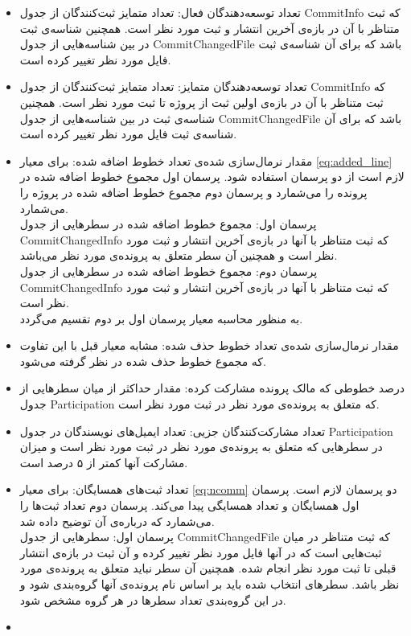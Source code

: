 \begin{itemize}
	\item 
	تعداد توسعه‌دهندگان فعال:  تعداد متمایز ثبت‌کنند‌گان از جدول CommitInfo که ثبت متناظر با آن در بازه‌ی آخرین انتشار و ثبت مورد نظر است. همچنین  شناسه‌ی ثبت در بین شناسه‌هایی از جدول CommitChangedFile باشد که برای آن شناسه‌ی ثبت فایل مورد نظر تغییر کرده است.
	\item
	تعداد توسعه‌دهندگان متمایز: تعداد متمایز ثبت‌کنند‌گان از جدول CommitInfo که ثبت متناظر با آن در بازه‌ی  اولین ثبت از پروژه تا ثبت مورد نظر است. همچنین  شناسه‌ی ثبت در بین شناسه‌هایی از جدول CommitChangedFile باشد که برای آن شناسه‌ی ثبت فایل مورد نظر تغییر کرده است.  
	\item
	مقدار نرمال‌سازی شده‌ی تعداد خطوط اضافه شده: برای   معیار \ref{eq:added_line} لازم است از دو پرسمان استفاده شود. پرسمان اول مجموع خطوط اضافه شده در پرونده را می‌شمارد و پرسمان دوم مجموع خطوط اضافه شده در پروژه را می‌شمارد.\\
	پرسمان اول: مجموع خطوط اضافه شده در سطرهایی از جدول CommitChangedInfo که ثبت متناظر با آنها در بازه‌ی آخرین انتشار و ثبت مورد نظر است و همچنین آن سطر متعلق به پرونده‌ی مورد نظر می‌باشد. \\
	پرسمان دوم: مجموع خطوط اضافه شده در سطرهایی از جدول CommitChangedInfo که ثبت متناظر با آنها در بازه‌ی آخرین انتشار و ثبت مورد نظر است.\\
	به منظور محاسبه معیار پرسمان اول بر دوم تقسیم می‌گردد. 
\item
مقدار نرمال‌سازی شده‌ی تعداد خطوط حذف شده: مشابه معیار قبل با این تفاوت که مجموع خطوط حذف شده در نظر گرفته می‌شود. 
\item
درصد خطوطی که مالک پرونده مشارکت کرده: مقدار حداکثر از میان سطرهایی  از جدول Participation که متعلق به پرونده‌ی مورد نظر در ثبت مورد نظر است. 
\item 
تعداد مشارکت‌کنندگان جزیی: تعداد ایمیل‌های نویسندگان در جدول Participation در سطرهایی که متعلق به پرونده‌ی مورد نظر در ثبت مورد نظر است و میزان مشارکت آنها کمتر از ۵ درصد است. 
\item
تعداد ثبت‌های همسایگان: برای  معیار  \ref{eq:ncomm} دو پرسمان لازم است. پرسمان اول همسایگان و تعداد همسایگی پیدا می‌کند. پرسمان دوم تعداد ثبت‌ها را می‌شمارد که درباره‌ی آن توضیح داده شد. \\
پرسمان اول: سطرهایی از جدول CommitChangedFile که ثبت متناظر در میان ثبت‌هایی است که در آنها فایل مورد نظر تغییر کرده و آن ثبت در بازه‌ی انتشار قبلی تا ثبت مورد نظر انجام شده. همچنین آن سطر نباید متعلق به پرونده‌ی مورد نظر باشد. سطر‌های انتخاب شده باید بر اساس نام پرونده‌ی آنها گروه‌بندی شود و در این گروه‌بندی تعداد سطر‌ها در هر گروه مشخص شود. 
\item

\end{itemize}
